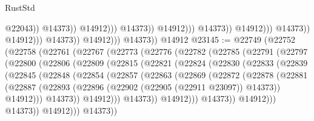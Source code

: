 \begin{lexlean}{RustStd}
\begin{coremodule}
                                                              @22043))
                                                          @14373))
                                                      @14912)))
                                                @14373))
                                            @14912)))
                                      @14373))
                                  @14912)))
                            @14373))
                        @14912)))
                  @14373))
              @14912)))
        @14373))
    @14912
@23145 := @22749
    (@22752
      (@22758
        (@22761
          (@22767
            (@22773
              (@22776
                (@22782
                  (@22785
                    (@22791
                      (@22797
                        (@22800
                          (@22806
                            (@22809
                              (@22815
                                (@22821
                                  (@22824
                                    (@22830
                                      (@22833
                                        (@22839
                                          (@22845
                                            (@22848
                                              (@22854
                                                (@22857
                                                  (@22863
                                                    (@22869
                                                      (@22872
                                                        (@22878
                                                          (@22881
                                                            (@22887
                                                              (@22893
                                                                (@22896
                                                                  (@22902
                                                                    (@22905 (@22911 @23097))
                                                                    @14373))
                                                                @14912)))
                                                          @14373))
                                                      @14912)))
                                                @14373))
                                            @14912)))
                                      @14373))
                                  @14912)))
                            @14373))
                        @14912)))
                  @14373))

\end{coremodule}
\end{lexlean}
